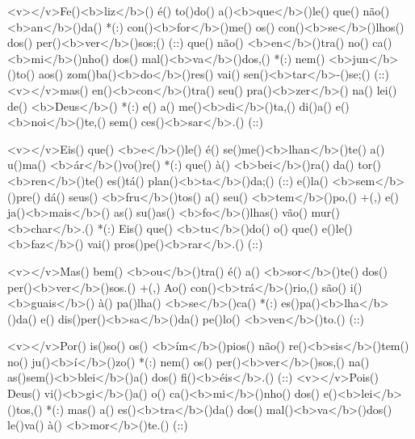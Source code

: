 <v></v>Fe()<b>liz</b>() é() to()do() a()<b>que</b>()le() que() não() <b>an</b>()da() *(:)
con()<b>for</b>()me() os() con()<b>se</b>()lhos() dos() per()<b>ver</b>()sos;() (::)
que() não() <b>en</b>()tra() no() ca()<b>mi</b>()nho() dos() mal()<b>va</b>()dos,() *(:)
nem() <b>jun</b>()to() aos() zom()ba()<b>do</b>()res() vai() sen()<b>tar</b>-()se;() (::) 
<v></v>mas() en()<b>con</b>()tra() seu() pra()<b>zer</b>() na() lei() de() <b>Deus</b>() *(:)
e() a() me()<b>di</b>()ta,() di()a() e() <b>noi</b>()te,() sem() ces()<b>sar</b>.() (::)

<v></v>Eis() que() <b>e</b>()le() é() se()me()<b>lhan</b>()te() a() u()ma() <b>ár</b>()vo()re() *(:)
que() à() <b>bei</b>()ra() da() tor()<b>ren</b>()te() es()tá() plan()<b>ta</b>()da;() (::) 
e()la() <b>sem</b>()pre() dá() seus() <b>fru</b>()tos() a() seu() <b>tem</b>()po,() +(,)
e() ja()<b>mais</b>() as() su()as() <b>fo</b>()lhas() vão() mur()<b>char</b>.() *(:)
Eis() que() <b>tu</b>()do() o() que() e()le() <b>faz</b>() vai() pros()pe()<b>rar</b>.() (::)

<v></v>Mas() bem() <b>ou</b>()tra() é() a() <b>sor</b>()te() dos() per()<b>ver</b>()sos.() +(,) 
Ao() con()<b>trá</b>()rio,() são() i()<b>guais</b>() à() pa()lha() <b>se</b>()ca() *(:)
es()pa()<b>lha</b>()da() e() dis()per()<b>sa</b>()da() pe()lo() <b>ven</b>()to.() (::)

<v></v>Por() is()so() os() <b>ím</b>()pios() não() re()<b>sis</b>()tem() no() ju()<b>í</b>()zo() *(:)
nem() os() per()<b>ver</b>()sos,() na() as()sem()<b>blei</b>()a() dos() fi()<b>éis</b>.() (::) 
<v></v>Pois() Deus() vi()<b>gi</b>()a() o() ca()<b>mi</b>()nho() dos() e()<b>lei</b>()tos,() *(:)
mas() a() es()<b>tra</b>()da() dos() mal()<b>va</b>()dos() le()va() à() <b>mor</b>()te.() (::)